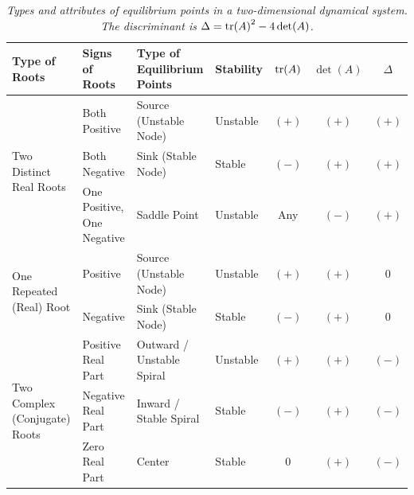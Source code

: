 \begin{table}
    \centering
    \small
    \begin{tabular}{|p{40pt}|p{48pt}|p{68pt}|p{44pt}|c|c|c|}
    \hline
    Type of Roots & Signs of Roots & Type of Equilibrium Points & Stability & $\tr(A)$ & $\det(A)$ & $\Delta$ \\
    \hline
    \multirow{3}{40pt}{Two Distinct Real Roots} & Both Positive & Source (Unstable Node) & Unstable & $(+)$ & $(+)$ & $(+)$ \\
    \hhline{~------}
     & Both Negative & Sink (Stable Node) & Stable & $(-)$ & $(+)$ & $(+)$ \\
    \hhline{~------} 
    & One Positive, One Negative & Saddle Point & Unstable & Any & $(-)$ & $(+)$ \\
    \hline
    \multirow{2}{40pt}{One Repeated (Real) Root} & Positive & Source (Unstable Node) & Unstable & $(+)$ & $(+)$ & $0$ \\
    \hhline{~------}
     & Negative & Sink (Stable Node) & Stable & $(-)$ & $(+)$ & $0$ \\
    \hline
    \multirow{3}{40pt}{Two Complex (Conjugate) Roots} & Positive Real Part & Outward / Unstable Spiral & Unstable & $(+)$ & $(+)$ & $(-)$ \\
    \hhline{~------}
     & Negative Real Part & Inward / Stable Spiral & Stable & $(-)$ & $(+)$ & $(-)$ \\
    \hhline{~------} 
    & Zero Real Part & Center & Stable & $0$ & $(+)$ & $(-)$ \\
    \hline
    \end{tabular}
    \caption{\textit{Types and attributes of equilibrium points in a two-dimensional dynamical system. The discriminant is $\Delta = \tr(A)^2 - 4\det(A)$.}}
    \label{tab:equilpts}
\end{table}


